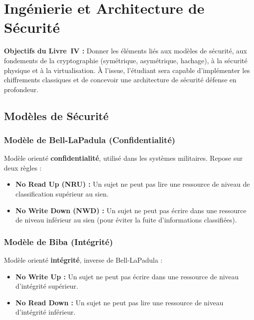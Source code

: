 
\chapter{Ingénierie et Architecture de Sécurité}
\label{chap:ingenierie_archi}

\begin{boxobjectifs}
\textbf{Objectifs du Livre~IV :} Donner les éléments liés aux modèles de sécurité, aux fondements de la cryptographie (symétrique, asymétrique, hachage), à la sécurité physique et à la virtualisation. À l'issue, l'étudiant sera capable d'implémenter les chiffrements classiques et de concevoir une architecture de sécurité défense en profondeur.
\end{boxobjectifs}

\section{Modèles de Sécurité}

\subsection{Modèle de Bell-LaPadula (Confidentialité)}

\begin{boxdef}
Modèle orienté \textbf{confidentialité}, utilisé dans les systèmes militaires. Repose sur deux règles :
\begin{itemize}
    \item \textbf{No Read Up (NRU) :} Un sujet ne peut pas lire une ressource de niveau de classification supérieur au sien.
    \item \textbf{No Write Down (NWD) :} Un sujet ne peut pas écrire dans une ressource de niveau inférieur au sien (pour éviter la fuite d'informations classifiées).
\end{itemize}
\end{boxdef}

\subsection{Modèle de Biba (Intégrité)}
\begin{boxdef}
Modèle orienté \textbf{intégrité}, inverse de Bell-LaPadula :
\begin{itemize}
    \item \textbf{No Write Up :} Un sujet ne peut pas écrire dans une ressource de niveau d'intégrité supérieur.
    \item \textbf{No Read Down :} Un sujet ne peut pas lire une ressource de niveau d'intégrité inférieur.
\end{itemize}
\end{boxdef}

